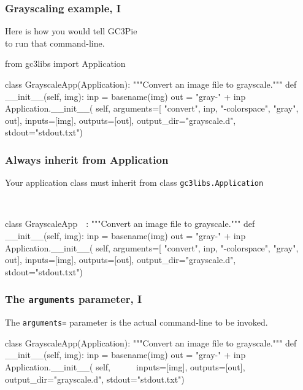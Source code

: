 \documentclass[english,serif,mathserif,xcolor=pdftex,dvipsnames,table]{beamer}
\begin{document}
\begin{frame}[fragile]
\frametitle{Grayscaling example, I}

  Here is how you would tell GC3Pie \\ to run that command-line.

\begin{python}
from gc3libs import Application

class GrayscaleApp(Application):
  """Convert an image file to grayscale."""
  def __init__(self, img):
    inp = basename(img)
    out = "gray-" + inp
    Application.__init__(
      self,
      arguments=[
        "convert", inp, "-colorspace", "gray", out],
      inputs=[img],
      outputs=[out],
      output_dir="grayscale.d",
      stdout="stdout.txt")
\end{python}
\end{frame}


\begin{frame}[fragile]
\frametitle{Always inherit from Application}

  Your application class must inherit from class \texttt{gc3libs.Application}
  \+
\begin{python}
~~

class GrayscaleApp~~:
  """Convert an image file to grayscale."""
  def __init__(self, img):
    inp = basename(img)
    out = "gray-" + inp
    Application.__init__(
      self,
      arguments=[
        "convert", inp, "-colorspace", "gray", out],
      inputs=[img],
      outputs=[out],
      output_dir="grayscale.d",
      stdout="stdout.txt")
\end{python}
\end{frame}


\begin{frame}[fragile]
  \frametitle{The \texttt{arguments} parameter, I}

  The \texttt{arguments=} parameter is the actual command-line to be invoked.

  \+
\begin{python}
class GrayscaleApp(Application):
  """Convert an image file to grayscale."""
  def __init__(self, img):
    inp = basename(img)
    out = "gray-" + inp
    Application.__init__(
      self,
      ~\HL{arguments=[}~
        ~\HL{"convert", inp, "-colorspace", "gray", out],}~
      inputs=[img],
      outputs=[out],
      output_dir="grayscale.d",
      stdout="stdout.txt")
\end{python}
\end{frame}
\end{document}
